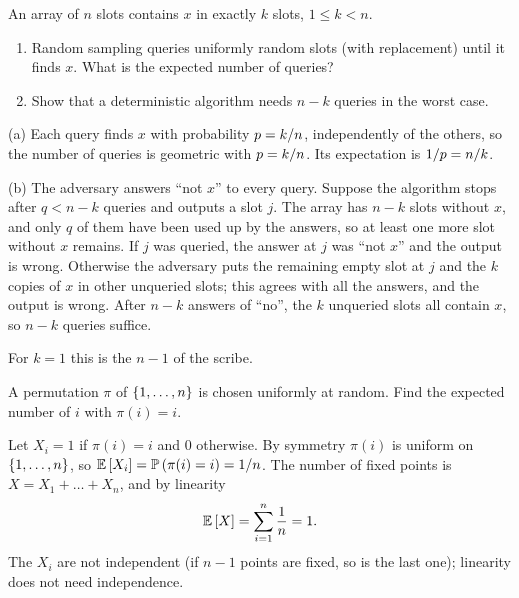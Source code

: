 \begin{exercisebox}
\begin{pproblem}\label{wp:kcopies}
    An array of $n$ slots contains $x$ in exactly $k$ slots, $1 \leq k < n$.
    \begin{enumerate}[label=(\alph*)]
        \item Random sampling queries uniformly random slots (with replacement) until it finds $x$.
              What is the expected number of queries?
        \item Show that a deterministic algorithm needs $n - k$ queries in the worst case.
    \end{enumerate}
\end{pproblem}
\tcblower
\begin{wsolution}
    (a) Each query finds $x$ with probability $p = k/n$, independently of the others, so the
    number of queries is geometric with $p = k/n$. Its expectation is
    $1/p = n/k$.

    (b) The adversary answers ``not $x$'' to every query. Suppose the algorithm stops after
    $q < n - k$ queries and outputs a slot $j$. The array has $n - k$ slots without $x$, and only
    $q$ of them have been used up by the answers, so at least one more slot without $x$ remains. If
    $j$ was queried, the answer at $j$ was ``not $x$'' and the output is wrong. Otherwise the
    adversary puts the remaining empty slot at $j$ and the $k$ copies of $x$ in other unqueried
    slots; this agrees with all the answers, and the output is wrong. After $n - k$ answers of
    ``no'', the $k$ unqueried slots all contain $x$, so $n - k$ queries suffice.

    For $k = 1$ this is the $n - 1$ of the scribe.
\end{wsolution}
\end{exercisebox}

\begin{exercisebox}
\begin{pproblem}\label{wp:fixed}
    A permutation $\pi$ of $\left\lbrace1, \dots, n\right\rbrace$ is chosen uniformly at random. Find the expected
    number of $i$ with $\pi(i) = i$.
\end{pproblem}
\tcblower
\begin{wsolution}
    Let $X_i = 1$ if $\pi(i) = i$ and $0$ otherwise. By symmetry $\pi(i)$ is uniform on
    $\left\lbrace1, \dots, n\right\rbrace$, so $\operatorname{\mathbb{E}}\left[X_i\right] = \operatorname{\mathbb{P}}\left(\pi(i) = i\right) = 1/n$. The number of
    fixed points is $X = X_1 + \dots + X_n$, and by linearity
    \[\operatorname{\mathbb{E}}\left[X\right] = \sum_{i=1}^{n} \frac{1}{n} = 1.\]
    The $X_i$ are not independent (if $n - 1$ points are fixed, so is the last one); linearity does
    not need independence.
\end{wsolution}
\end{exercisebox}

